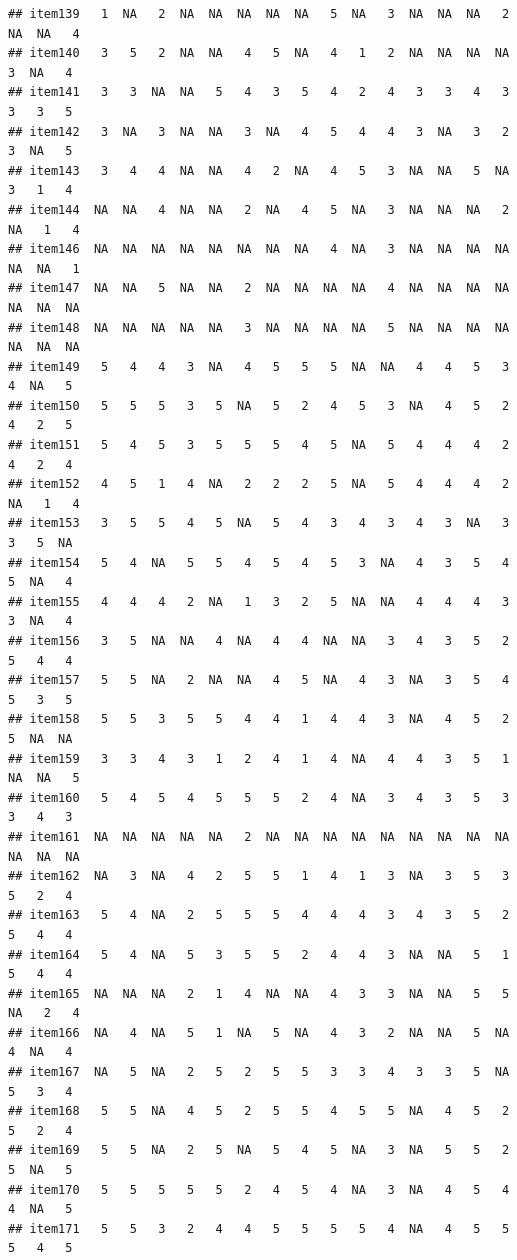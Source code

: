 \documentclass[
  man]{apa6}
\begin{document}
\begin{verbatim}
## item139   1  NA   2  NA  NA  NA  NA  NA   5  NA   3  NA  NA  NA   2  NA  NA   4
## item140   3   5   2  NA  NA   4   5  NA   4   1   2  NA  NA  NA  NA   3  NA   4
## item141   3   3  NA  NA   5   4   3   5   4   2   4   3   3   4   3   3   3   5
## item142   3  NA   3  NA  NA   3  NA   4   5   4   4   3  NA   3   2   3  NA   5
## item143   3   4   4  NA  NA   4   2  NA   4   5   3  NA  NA   5  NA   3   1   4
## item144  NA  NA   4  NA  NA   2  NA   4   5  NA   3  NA  NA  NA   2  NA   1   4
## item146  NA  NA  NA  NA  NA  NA  NA  NA   4  NA   3  NA  NA  NA  NA  NA  NA   1
## item147  NA  NA   5  NA  NA   2  NA  NA  NA  NA   4  NA  NA  NA  NA  NA  NA  NA
## item148  NA  NA  NA  NA  NA   3  NA  NA  NA  NA   5  NA  NA  NA  NA  NA  NA  NA
## item149   5   4   4   3  NA   4   5   5   5  NA  NA   4   4   5   3   4  NA   5
## item150   5   5   5   3   5  NA   5   2   4   5   3  NA   4   5   2   4   2   5
## item151   5   4   5   3   5   5   5   4   5  NA   5   4   4   4   2   4   2   4
## item152   4   5   1   4  NA   2   2   2   5  NA   5   4   4   4   2  NA   1   4
## item153   3   5   5   4   5  NA   5   4   3   4   3   4   3  NA   3   3   5  NA
## item154   5   4  NA   5   5   4   5   4   5   3  NA   4   3   5   4   5  NA   4
## item155   4   4   4   2  NA   1   3   2   5  NA  NA   4   4   4   3   3  NA   4
## item156   3   5  NA  NA   4  NA   4   4  NA  NA   3   4   3   5   2   5   4   4
## item157   5   5  NA   2  NA  NA   4   5  NA   4   3  NA   3   5   4   5   3   5
## item158   5   5   3   5   5   4   4   1   4   4   3  NA   4   5   2   5  NA  NA
## item159   3   3   4   3   1   2   4   1   4  NA   4   4   3   5   1  NA  NA   5
## item160   5   4   5   4   5   5   5   2   4  NA   3   4   3   5   3   3   4   3
## item161  NA  NA  NA  NA  NA   2  NA  NA  NA  NA  NA  NA  NA  NA  NA  NA  NA  NA
## item162  NA   3  NA   4   2   5   5   1   4   1   3  NA   3   5   3   5   2   4
## item163   5   4  NA   2   5   5   5   4   4   4   3   4   3   5   2   5   4   4
## item164   5   4  NA   5   3   5   5   2   4   4   3  NA  NA   5   1   5   4   4
## item165  NA  NA  NA   2   1   4  NA  NA   4   3   3  NA  NA   5   5  NA   2   4
## item166  NA   4  NA   5   1  NA   5  NA   4   3   2  NA  NA   5  NA   4  NA   4
## item167  NA   5  NA   2   5   2   5   5   3   3   4   3   3   5  NA   5   3   4
## item168   5   5  NA   4   5   2   5   5   4   5   5  NA   4   5   2   5   2   4
## item169   5   5  NA   2   5  NA   5   4   5  NA   3  NA   5   5   2   5  NA   5
## item170   5   5   5   5   5   2   4   5   4  NA   3  NA   4   5   4   4  NA   5
## item171   5   5   3   2   4   4   5   5   5   5   4  NA   4   5   5   5   4   5

\end{verbatim}
\end{document}
